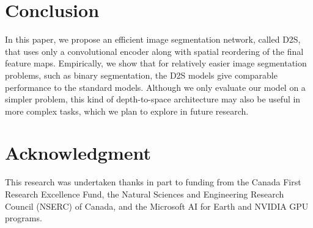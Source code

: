 \documentclass[10pt,twocolumn,letterpaper]{article}
\begin{document}
\section{Conclusion}

In this paper, we propose an efficient image segmentation network, called D2S, that uses only a convolutional encoder along with spatial reordering of the final feature maps. Empirically, we show that for relatively easier image segmentation problems, such as binary segmentation, the D2S models give comparable performance to the standard models. Although we only evaluate our model on a simpler problem, this kind of depth-to-space architecture may also be useful in more complex tasks, which we plan to explore in future research.

\section*{Acknowledgment}

This research was undertaken thanks in part to funding from the Canada First Research Excellence Fund, the Natural Sciences and Engineering Research Council (NSERC) of Canada, and the Microsoft AI for Earth and NVIDIA GPU programs.


{\small


}
\end{document}
